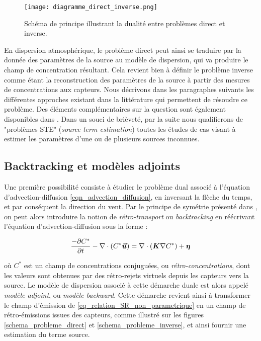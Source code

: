 	\begin{figure}
		\centering
		\texttt{[image: diagramme\_direct\_inverse.png]}
		\caption{Schéma de principe illustrant la dualité entre problèmes direct et inverse.}
		\label{fig_diagramme_direct_inverse}
	\end{figure}
	
	
	En dispersion atmosphérique, le problème direct peut ainsi se traduire par la donnée des paramètres de la source au modèle de dispersion, qui va produire le champ de concentration résultant. Cela revient bien à définir le problème inverse comme étant la reconstruction des paramètres de la source à partir des mesures de concentrations aux capteurs. Nous décrivons dans les paragraphes suivants les différentes approches existant dans la littérature qui permettent de résoudre ce problème. Des éléments complémentaires sur la question sont également disponibles dans \cite{Rao2007}. Dans un souci de brièveté, par la suite nous qualifierons de "problèmes STE" (\textit{source term estimation}) toutes les études de cas visant à estimer les paramètres d'une ou de plusieurs sources inconnues.\\
	
	
 \subsection{Backtracking et modèles adjoints}
 
 Une première possibilité consiste à étudier le problème dual associé à l'équation d'advection-diffusion  \eqref{eqn_advection_diffusion}, en inversant la flèche du temps, et par conséquent la direction du vent.  Par le principe de symétrie présenté dans \cite{Hourdin2006a}, on peut alors introduire la notion de \textit{rétro-transport} ou \textit{backtracking} en  réécrivant l'équation d'advection-diffusion sous la forme : 
 
 \begin{equation}
 \label{eqn_advection_diffusion_backward}
 \dfrac{-\partial C^*}{\partial t} - \nabla \cdot(C^*\bm{\vec{u}}) = \nabla \cdot (\bm{K}\nabla C^*) + {\bm{\eta}}
 \end{equation}
 
 où $C^*$ est un champ de concentrations conjuguées, ou \textit{rétro-concentrations}, dont les valeurs sont obtenues par des rétro-rejets virtuels depuis les capteurs vers la source. Le modèle de dispersion associé à cette démarche duale est alors appelé \textit{modèle adjoint}, ou \textit{modèle backward}. Cette démarche revient ainsi à transformer le champ d'émission de \eqref{eq_relation_SR_non_parametrique} en un champ de rétro-émissions issues des capteurs, comme illustré sur les figures \ref{schema_probleme_direct} et \ref{schema_probleme_inverse}, et ainsi fournir une estimation du terme source.\\
 
